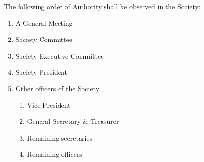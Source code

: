 \begin{clause}
	The following order of Authority shall be observed in the Society:
	\begin{enumerate}[topsep=0em,itemsep=0em]
		\item A General Meeting
		\item Society Committee
		\item Society Executive Committee
		\item Society President
		\item Other officers of the Society
		\begin{enumerate}[topsep=0em,itemsep=0em]
			\item Vice President
			\item General Secretary \& Treasurer
			\item Remaining secretaries
			\item Remaining officers
		\end{enumerate}
	\end{enumerate}
\end{clause}
